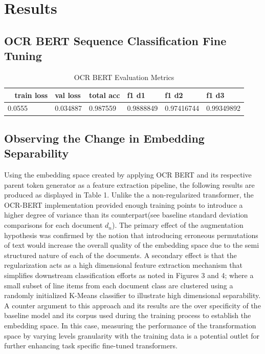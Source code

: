 \documentclass{article}
\begin{document}
\section{Results}
\subsection{OCR BERT Sequence Classification Fine Tuning}
\begin{table}[!ht]
    \centering
     \caption{OCR BERT Evaluation Metrics}
    \begin{tabular}{|l|l|l|l|l|l|}
    \hline
      ~ train loss & val loss & total acc & f1 d1 & f1 d2  & f1 d3 \\ \hline
       0.0555 & 0.034887 & 0.987559 & 0.9888849 & 0.97416744 & 0.99349892  \\ \hline
    \end{tabular}
\end{table}
\subsection{Observing the Change in Embedding Separability}
Using the embedding space created by applying OCR BERT and its respective parent token generator as a feature extraction pipeline, the following results are produced as displayed in Table 1. Unlike the a non-regularized transformer, the OCR-BERT implementation provided enough training points to introduce a higher degree of variance than its counterpart(see baseline standard deviation comparisons for each document $d_n$). The primary effect of the augmentation hypothesis was confirmed by the notion that introducing erroneous permutations of text would increase the overall quality of the embedding space due to the semi structured nature of each of the documents. A secondary effect is that the regularization acts as a high dimensional feature extraction mechanism that simplifies downstream classification efforts as noted in Figures 3 and 4; where a small subset of line items from each document class are clustered using a randomly initialized K-Means classifier to illustrate high dimensional separability. A counter argument to this approach and its results are the over specificity of the baseline model and its corpus used during the training process to establish the embedding space. In this case, measuring the performance of the transformation space by varying levels granularity with the training data is a potential outlet for further enhancing task specific fine-tuned transformers.
\end{document}
